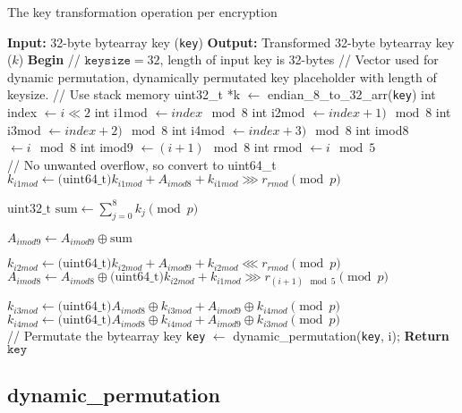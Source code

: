 \documentclass[fleqn, a4paper,12pt]{article}
\newcommand{\COMMENT}[1]{\State \textcolor[HTML]{003e57}{// #1}}
\begin{document}
\begin{algorithm}[H] %
\caption{The key transformation operation per encryption}
\begin{algorithmic}[1]  %
\State \textbf{Input:} 32-byte bytearray key (\texttt{key})
\State \textbf{Output:} Transformed 32-byte bytearray key ($k$)
\State \textbf{Begin}
\COMMENT{$\texttt{keysize} = 32$, length of input key is 32-bytes}
\COMMENT{Vector used for dynamic permutation, dynamically permutated key placeholder with length of keysize.}
\COMMENT{Use stack memory}
\State uint32\_t *k $\gets$ endian\_8\_to\_32\_arr(\texttt{key})
	\State int index $\gets i \ll 2$
	\State int i1mod $\gets index \mod 8$
	\State int i2mod $\gets index+1) \mod 8$
	\State int i3mod $\gets index+2) \mod 8$
	\State int i4mod $\gets index+3) \mod 8$
	\State int imod8 $\gets i \mod 8$
	\State int imod9 $\gets (i+1) \mod 8$
	\State int rmod $\gets i \mod 5$ \\

	\COMMENT{No unwanted overflow, so convert to uint64\_t}
	\State $k_{i1mod} \gets \text{(uint64\_t)} k_{i1mod} + A_{imod8} + k_{i1mod} \ggg r_{rmod}  \pmod p $

	\State $ \text{uint32\_t sum} \gets \displaystyle \sum_{j=0}^8 k_j \pmod p $

	\State $A_{imod9} \gets A_{imod9} \oplus \text{sum}$

	\State $k_{i2mod} \gets \text{(uint64\_t)} k_{i2mod} + A_{imod9} + k_{i2mod} \lll r_{rmod} \pmod p$
	\State $A_{imod8} \gets A_{imod8} \oplus \text{(uint64\_t)} k_{i2mod} + k_{i1mod} \ggg r_{(i+1) \mod 5} \pmod p$

	\State $k_{i3mod} \gets \text{(uint64\_t)} A_{imod8} \oplus k_{i3mod} + A_{imod9} \oplus k_{i4mod} \pmod p$
	\State $k_{i4mod} \gets  \text{(uint64\_t)} A_{imod8} \oplus k_{i4mod} + A_{imod9} \oplus k_{i3mod} \pmod p$ \\

	\COMMENT{Permutate the bytearray key}
	\State \texttt{key} $\gets$ dynamic\_permutation(\texttt{key}, i);
\EndFor
\State \textbf{Return} $\texttt{key}$
\end{algorithmic}
\end{algorithm}

\subsection{dynamic\_permutation} \label{dynamic_permutation}
\end{document}
